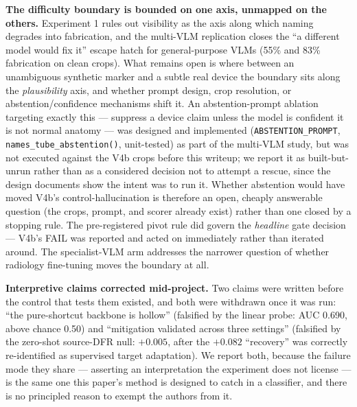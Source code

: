\documentclass{ieeeaccess}
\begin{document}
\textbf{The difficulty boundary is bounded on one axis, unmapped on the others.} Experiment 1 rules out visibility as the axis along which naming degrades into fabrication, and the multi-VLM replication closes the ``a different model would fix it'' escape hatch for general-purpose VLMs (55\% and 83\% fabrication on clean crops). What remains open is where between an unambiguous synthetic marker and a subtle real device the boundary sits along the \emph{plausibility} axis, and whether prompt design, crop resolution, or abstention/confidence mechanisms shift it. An abstention-prompt ablation targeting exactly this --- suppress a device claim unless the model is confident it is not normal anatomy --- was designed and implemented (\texttt{ABSTENTION\_PROMPT}, \texttt{names\_tube\_abstention()}, unit-tested) as part of the multi-VLM study, but was not executed against the V4b crops before this writeup; we report it as built-but-unrun rather than as a considered decision not to attempt a rescue, since the design documents show the intent was to run it. Whether abstention would have moved V4b's control-hallucination is therefore an open, cheaply answerable question (the crops, prompt, and scorer already exist) rather than one closed by a stopping rule. The pre-registered pivot rule did govern the \emph{headline} gate decision --- V4b's FAIL was reported and acted on immediately rather than iterated around. The specialist-VLM arm addresses the narrower question of whether radiology fine-tuning moves the boundary at all.

\textbf{Interpretive claims corrected mid-project.} Two claims were written before the control that tests them existed, and both were withdrawn once it was run: ``the pure-shortcut backbone is hollow'' (falsified by the linear probe: AUC 0.690, above chance 0.50) and ``mitigation validated across three settings'' (falsified by the zero-shot source-DFR null: $+0.005$, after the $+0.082$ ``recovery'' was correctly re-identified as supervised target adaptation). We report both, because the failure mode they share --- asserting an interpretation the experiment does not license --- is the same one this paper's method is designed to catch in a classifier, and there is no principled reason to exempt the authors from it.

\end{document}

